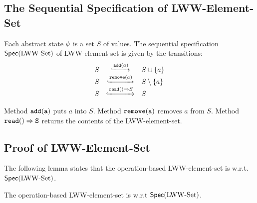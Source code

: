 \subsection{The Sequential Specification of LWW-Element-Set}
\label{subsec:the sequential specification of LWW-element-set}

Each abstract state $\abstate$ is a set $S$ of values. The sequential specification $\specLWWSet$ of LWW-element-set is given by the transitions:
\[
  \begin{array}{rcl}
    S &
               \specarrow{\alabelshort[\mathtt{add}]{a}}
    & S \cup \{ a \} \\
    S &
               \specarrow{\alabelshort[\mathtt{remove}]{a}}
    & S \setminus \{a\} \\
    S
    & \specarrow{\alabellong[\mathtt{read}]{}{ S }{}}
    & S
  \end{array}
\]

Method $\alabelshort[{\tt add}]{a}$ puts $a$ into $S$. Method $\alabelshort[{\tt remove}]{a}$ removes $a$ from $S$. Method $\alabellong[{\tt read}]{}{S}{}$ returns the contents of the LWW-element-set.



\subsection{Proof of LWW-Element-Set}
\label{subsec:proof of LWW-element-set}

The following lemma states that the operation-based LWW-element-set is \crdtlinearizable{} w.r.t. $\specLWWSet$.

\begin{lemma}
\label{lemma:operation-based LWW-element-set is correct}
The operation-based LWW-element-set is \crdtlinearizable{} w.r.t $\specLWWSet$.
\end{lemma}


